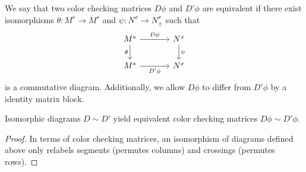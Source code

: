 We say that two color checking matrices $D\phi$ and $D'\phi$ are equivalent if 
there exist isomorphisms $\theta:M^s\to M^s$ and $\psi:N^x\to N_\pm^x$ such that
$$
\begin{tikzcd}[column sep=large]
  M^s\arrow[r, "D\phi"]\arrow[d, "\theta" left] & N^x\arrow[d, "\psi" right]\\ 
  M^s\arrow[r, "D'\phi" below] & N^x
\end{tikzcd}
$$
is a commutative diagram. Additionally, we allow $D\phi$ to differ from $D'\phi$ by a identity matrix block.

\begin{lemma}
  Isomorphic diagrams $D\sim D'$ yield equivalent color checking matrices $D\phi\sim D'\phi$.
\end{lemma}

\begin{proof}
  In terms of color checking matrices, an isomorphism of diagrams defined above only relabels segments (permutes columns) and crossings (permutes rows).
\end{proof}










